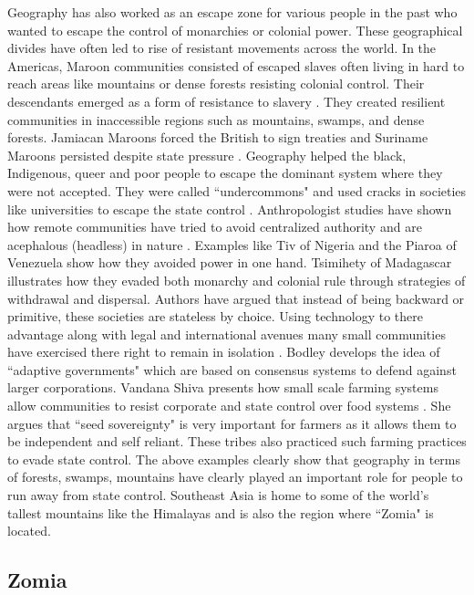 Geography has also worked as an escape zone for various people in the past who wanted to escape the control of monarchies or colonial power. These geographical divides have often led to rise of resistant movements across the world. In the Americas, Maroon communities consisted of escaped slaves often living in hard to reach areas like mountains or dense forests resisting colonial control. Their descendants emerged as a form of resistance to slavery \citep{price2020rainforest}. They created resilient communities in inaccessible regions such as mountains, swamps, and dense forests. Jamiacan Maroons forced the British to sign treaties and Suriname Maroons persisted despite state pressure \citep{Cultural_Survival_Bilby}. Geography helped the  black, Indigenous, queer and poor people to escape the dominant system where they were not accepted. They were called ``undercommons" and used cracks in societies like universities to escape the state control \citep{harney2013undercommons}. Anthropologist studies have shown how remote communities have tried to avoid centralized authority and are acephalous (headless) in nature \citep{graeber2004fragments}. Examples like Tiv of Nigeria and the Piaroa of Venezuela show how they avoided power in one hand. Tsimihety of Madagascar illustrates how they evaded both monarchy and colonial rule through strategies of withdrawal and dispersal. Authors have argued that instead of being backward or primitive, these societies are stateless by choice. Using technology to there advantage along with legal and international avenues many small communities have exercised there right to remain in isolation \citep{bodley2012anthropology,bodley2014victims}. Bodley develops the idea of ``adaptive governments" which are based on consensus systems to defend against larger corporations. Vandana Shiva presents how small scale farming systems allow communities to resist corporate and state control over food systems \citep{hrynkow2018}. She argues that ``seed sovereignty" is very important for farmers as it allows them to be independent and self reliant. These tribes also practiced such farming practices to evade state control. The above examples clearly show that geography in terms of forests, swamps, mountains have clearly played an important role for people to run away from state control. Southeast Asia is home to some of the world's tallest mountains like the Himalayas and is also the region where ``Zomia" is located.

\subsection{Zomia}
